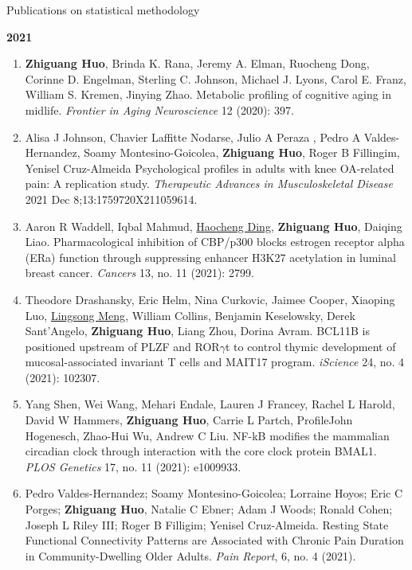 \documentclass{resume} %
\begin{document}
\begin{rSection}{Publications on statistical methodology}
\begin{enumerate}[noitemsep,topsep=0pt, resume]
\end{enumerate}


\textbf{2021}
\begin{enumerate}[noitemsep,topsep=0pt, resume]

\item  {\bf Zhiguang Huo}, Brinda K. Rana, Jeremy A. Elman, Ruocheng Dong, Corinne D. Engelman, Sterling C. Johnson, Michael J. Lyons, Carol E. Franz, William S. Kremen, Jinying Zhao.
Metabolic profiling of cognitive aging in midlife.
\emph{Frontier in Aging Neuroscience} 12 (2020): 397.
\label{bioinfo_27} 


\item
Alisa J Johnson, Chavier Laffitte Nodarse, Julio A Peraza , Pedro A Valdes-Hernandez, Soamy Montesino-Goicolea, {\bf Zhiguang Huo}, Roger B Fillingim, Yenisel Cruz-Almeida
Psychological profiles in adults with knee OA-related pain: A replication study.
\emph{Therapeutic Advances in Musculoskeletal Disease} 2021 Dec 8;13:1759720X211059614.
\label{mlapp_5} 

\item
Aaron R Waddell, Iqbal Mahmud, \underline{Haocheng Ding}, {\bf Zhiguang Huo}, Daiqing Liao. 
Pharmacological inhibition of CBP/p300 blocks estrogen receptor alpha (ERa) function through suppressing enhancer H3K27 acetylation in luminal breast cancer.
\emph{Cancers} 13, no. 11 (2021): 2799.
\label{bioinfo_26} 


\item
Theodore Drashansky, Eric Helm, Nina Curkovic, Jaimee Cooper, Xiaoping Luo, \underline{Lingsong Meng}, William Collins, Benjamin Keselowsky, Derek Sant'Angelo, {\bf Zhiguang Huo}, Liang Zhou, Dorina Avram.
BCL11B is positioned upstream of PLZF and ROR$\gamma$t to control thymic development of mucosal-associated invariant T cells and MAIT17 program.
\emph{iScience}  24, no. 4 (2021): 102307.
\label{bioinfo_25} 


\item  
Yang Shen, Wei Wang, Mehari Endale, Lauren J Francey, Rachel L Harold, David W Hammers, {\bf Zhiguang Huo}, Carrie L Partch, ProfileJohn Hogenesch, Zhao-Hui Wu, Andrew C Liu.
NF-kB modifies the mammalian circadian clock through interaction with the core clock protein BMAL1.
\emph{PLOS Genetics} 17, no. 11 (2021): e1009933.
\label{bioinfo_24}

\item 
 Pedro Valdes-Hernandez; Soamy Montesino-Goicolea; Lorraine Hoyos; Eric C Porges; {\bf Zhiguang Huo}, Natalie C Ebner; Adam J Woods; Ronald Cohen; Joseph L Riley III; Roger B Filligim; Yenisel Cruz-Almeida. 
 Resting State Functional Connectivity Patterns are Associated with Chronic Pain Duration in Community-Dwelling Older Adults. 
\emph{Pain Report},  6, no. 4 (2021).



\end{enumerate}
\end{rSection}
\end{document}
